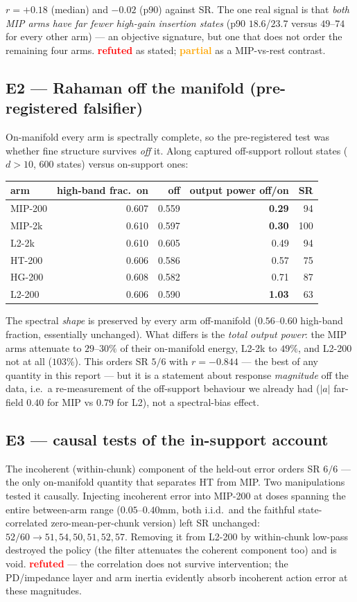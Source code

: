 \documentclass[10pt]{article}
\newcommand{\no}{\textcolor{red}{\textbf{refuted}}}
\newcommand{\partialv}{\textcolor{orange}{\textbf{partial}}}
\begin{document}
$r=+0.18$ (median) and $-0.02$ (p90) against SR. The one real signal is
that \emph{both MIP arms have far fewer high-gain insertion states}
(p90 $18.6$/$23.7$ versus $49$--$74$ for every other arm) --- an objective
signature, but one that does not order the remaining four arms. \no{} as
stated; \partialv{} as a MIP-vs-rest contrast.

\subsection*{E2 --- Rahaman off the manifold (pre-registered falsifier)}
On-manifold every arm is spectrally complete, so the pre-registered test
was whether fine structure survives \emph{off} it. Along captured
off-support rollout states ($d>10$, 600 states) versus on-support ones:

\begin{center}\small
\begin{tabular}{lrrrr}
\toprule
arm & high-band frac.\ on & off & output power off/on & SR \\
\midrule
MIP-200 & 0.607 & 0.559 & \textbf{0.29} & 94 \\
MIP-2k  & 0.610 & 0.597 & \textbf{0.30} & 100 \\
L2-2k   & 0.610 & 0.605 & 0.49 & 94 \\
HT-200  & 0.606 & 0.586 & 0.57 & 75 \\
HG-200  & 0.608 & 0.582 & 0.71 & 87 \\
L2-200  & 0.606 & 0.590 & \textbf{1.03} & 63 \\
\bottomrule
\end{tabular}
\end{center}

The spectral \emph{shape} is preserved by every arm off-manifold
($0.56$--$0.60$ high-band fraction, essentially unchanged). What differs is
the \emph{total output power}: the MIP arms attenuate to $29$--$30\%$ of
their on-manifold energy, L2-2k to $49\%$, and L2-200 not at all
($103\%$). This orders SR $5/6$ with $r=-0.844$ --- the best of any
quantity in this report --- but it is a statement about response
\emph{magnitude} off the data, i.e.\ a re-measurement of the off-support
behaviour we already had ($|a|$ far-field $0.40$ for MIP vs $0.79$ for
L2), not a spectral-bias effect.

\subsection*{E3 --- causal tests of the in-support account}
The incoherent (within-chunk) component of the held-out error orders SR
$6/6$ --- the only on-manifold quantity that separates HT from MIP. Two
manipulations tested it causally. Injecting incoherent error into MIP-200
at doses spanning the entire between-arm range ($0.05$--$0.40$mm, both
i.i.d.\ and the faithful state-correlated zero-mean-per-chunk version)
left SR unchanged: $52/60 \to 51,54,50,51,52,57$. Removing it from L2-200
by within-chunk low-pass destroyed the policy (the filter attenuates the
coherent component too) and is void. \no{} --- the correlation does not
survive intervention; the PD/impedance layer and arm inertia evidently
absorb incoherent action error at these magnitudes.
\end{document}

